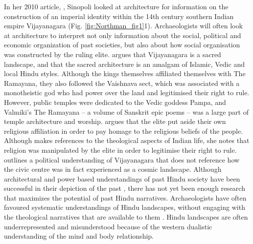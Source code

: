 	In her  2010 article, , Sinopoli looked at architecture for information on the construction of an imperial identity within the 14th century southern Indian empire Vijayanagara (Fig. \ref {fig:Northman_fig1}1). Archaeologists will often look at architecture to interpret not only information about the social, political and economic organization of past societies, but also about how social organisation was constructed by the ruling elite\parencite [222]{RenfrewBahn_2012}. \textcite {Sinopoli_2010} argues that Vijayanagara is a sacred landscape, and that the sacred architecture is an amalgam of Islamic, Vedic and local Hindu styles. Although the kings themselves affiliated themselves with The Ramayana, they also followed the Vaishnava sect, which was associated with a monotheistic god who had power over the land and legitimised their right to rule. However, public temples were dedicated to the Vedic goddess Pampa, and Valmiki’s The Ramayana -- a volume of Sanskrit epic poems -- was a large part of temple architecture and worship. \textcite[457] {Sinopoli_2010}  argues that the elite put aside their own religious affiliation in order to pay homage to the religious beliefs of the people. Although \textcite {Sinopoli_2010}makes references to the theological aspects of Indian life, she notes that religion was manipulated by the elite in order to legitimise their right to rule.\textcite {Sinopoli_2010}  outlines a political understanding of Vijayanagara that does not reference how the civic centre was in fact experienced as a cosmic landscape. Although architectural and power based understandings of past Hindu society have been successful in their depiction of the past \parencites{Fritz_1986}{Mack_2004}{Sinopoli_2010}, there has not yet been enough research that maximizes the potential of past Hindu narratives. Archaeologists have often favoured systematic understandings of Hindu landscapes, without engaging with the theological narratives that are available to them \parencite {Sugandhi_2011}. Hindu landscapes are often underrepresented and misunderstood because of the western dualistic understanding of the mind and body relationship.
	

